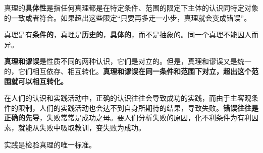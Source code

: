 {真理的}\textbf{{具体性}}{是指任何真理都是在特定条件、范围的限定下主体的认识同特定对象的一致或者符合。}如果超出这些限定``只要再多走一小步，真理就会变成错误''。

{真理是有}\textbf{{条件的}}{，真理是}\textbf{{历史的}}{，}\textbf{{具体的}}{，而不是抽象的。同一个真理不能因人而异。}

\textbf{真理和谬误}{是性质不同的两种认识，它们是对立的。但是，真理和谬误又是统一的，它们相互依存、相互转化。}\textbf{{真理和谬误在同一条件和范围下对立，超出这个范围就可以相互转化。}}

{在人们的认识和实践活动中，正确的认识往往会导致成功的实践，而由于主客观条件的限制，人们的实践活动也会达不到自身所期待的结果，导致失败。}\textbf{{错误往往是正确的先导}}{，失败常常是成功之母。要人们分析失败的原因，化不利条件为有利因素，就能从失败中吸取教训，变失败为成功。}

{}

实践是检验真理的唯一标准。

